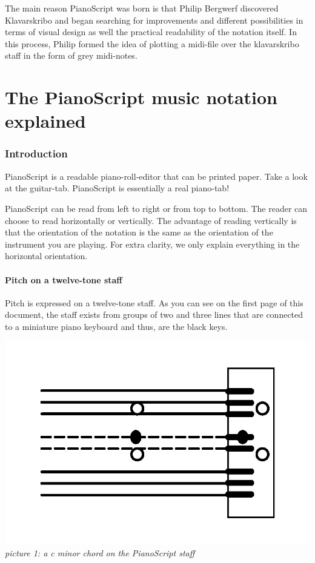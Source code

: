 \documentclass[11pt,a4paper]{article}
\begin{document}
The main reason PianoScript was born is that Philip Bergwerf discovered Klavarskribo and began searching for improvements and different possibilities in terms of visual design as well the practical readability of the notation itself. In this process, Philip formed the idea of plotting a midi-file over the klavarskribo staff in the form of grey midi-notes.\\

\pagebreak
\part{The PianoScript music notation explained}
\section{Introduction}
PianoScript is a readable piano-roll-editor that can be printed paper. Take a look at the guitar-tab. PianoScript is essentially a real piano-tab!

PianoScript can be read from left to right or from top to bottom. The reader can choose to read horizontally or vertically. The advantage of reading vertically is that the orientation of the notation is the same as the orientation of the instrument you are playing. For extra clarity, we only explain everything in the horizontal orientation.

\subsection{Pitch on a twelve-tone staff} 
Pitch is expressed on a twelve-tone staff. As you can see on the first page of this document, the staff exists from groups of two and three lines that are connected to a miniature piano keyboard and thus, are the black keys.

\begin{center}
\includegraphics[scale=1]{images/cminor.jpg}\\
\emph{\small picture 1: a c minor chord on the PianoScript staff} 
\end{center}
\end{document}
